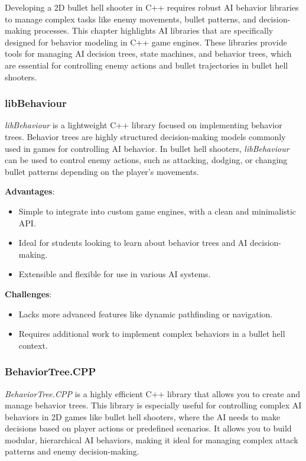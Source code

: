 Developing a 2D bullet hell shooter in C++ requires robust AI behavior libraries to manage complex tasks like enemy movements, bullet patterns, and decision-making processes. This chapter highlights AI libraries that are specifically designed for behavior modeling in C++ game engines. These libraries provide tools for managing AI decision trees, state machines, and behavior trees, which are essential for controlling enemy actions and bullet trajectories in bullet hell shooters.

\subsubsection{libBehaviour}

\textit{libBehaviour} is a lightweight C++ library focused on implementing behavior trees. Behavior trees are highly structured decision-making models commonly used in games for controlling AI behavior. In bullet hell shooters, \textit{libBehaviour} can be used to control enemy actions, such as attacking, dodging, or changing bullet patterns depending on the player’s movements.

\textbf{Advantages}:
\begin{itemize}
    \item Simple to integrate into custom game engines, with a clean and minimalistic API.
    \item Ideal for students looking to learn about behavior trees and AI decision-making.
    \item Extensible and flexible for use in various AI systems.
\end{itemize}

\textbf{Challenges}:
\begin{itemize}
    \item Lacks more advanced features like dynamic pathfinding or navigation.
    \item Requires additional work to implement complex behaviors in a bullet hell context.
\end{itemize}

\subsubsection{BehaviorTree.CPP}

\textit{BehaviorTree.CPP} is a highly efficient C++ library that allows you to create and manage behavior trees. This library is especially useful for controlling complex AI behaviors in 2D games like bullet hell shooters, where the AI needs to make decisions based on player actions or predefined scenarios. It allows you to build modular, hierarchical AI behaviors, making it ideal for managing complex attack patterns and enemy decision-making.

